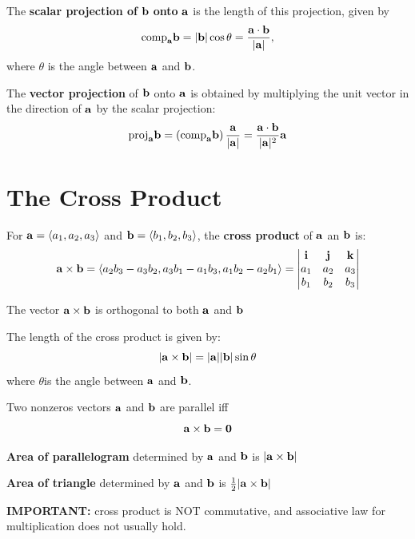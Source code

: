 \documentclass{report}
\begin{document}
The \textbf{scalar projection of} $\mathbf{b}$ \textbf{onto} $\mathbf{a}$ is the length of this 
projection, given by
\[
\text{comp}_{\mathbf{a}} \mathbf{b} = |\mathbf{b}|\cos\theta = \frac{\mathbf{a} \cdot \mathbf{b}}{|\mathbf{a}|},
\]
where $\theta$ is the angle between $\mathbf{a}$ and $\mathbf{b}$.

The \textbf{vector projection} of $\mathbf{b}$ onto $\mathbf{a}$ is obtained by multiplying the 
unit vector in the direction of $\mathbf{a}$ by the scalar projection:
\[
\text{proj}_{\mathbf{a}} \mathbf{b} = \left(\text{comp}_{\mathbf{a}} \mathbf{b} \right)\frac{\mathbf{a}}{|\mathbf{a}|} 
= \frac{\mathbf{a} \cdot \mathbf{b}}{|\mathbf{a}|^2}\mathbf{a}
\]

\section{The Cross Product}

\begin{definition}
For $\mathbf{a} = \langle a_1, a_2, a_3 \rangle$ and $\mathbf{b} = \langle b_1, b_2, b_3 \rangle$, the \textbf{cross product}
of $\mathbf{a}$ an $\mathbf{b}$ is:
\[\mathbf{a} \times \mathbf{b} = \langle a_2 b_3 - a_3 b_2, a_3 b_1 - a_1 b_3, a_1 b_2 - a_2 b_1 \rangle = \begin{vmatrix}
\mathbf{i} & \mathbf{j} & \mathbf{k} \\
a_1 & a_2 & a_3 \\
b_1 & b_2 & b_3
\end{vmatrix}
\]
\end{definition}

\begin{theorem}
    The vector $\mathbf{a} \times \mathbf{b}$ is orthogonal to both $\mathbf{a}$ and $\mathbf{b}$
\end{theorem}

\begin{theorem}
    The length of the cross product is given by: 
    \[ |\mathbf{a} \times \mathbf{b}| = |\mathbf{a}| |\mathbf{b}| \sin \theta\]
    where $\theta$is the angle between $\mathbf{a}$ and $\mathbf{b}$.
\end{theorem}

\begin{corollary}
    Two nonzeros vectors $\mathbf{a}$ and $\mathbf{b}$ are parallel iff 
    \[\mathbf{a} \times \mathbf{b} = \mathbf{0}\]
\end{corollary}

\textbf{Area of parallelogram} determined by $\mathbf{a}$ and $\mathbf{b}$ is $|\mathbf{a} \times \mathbf{b}|$

\textbf{Area of triangle} determined by $\mathbf{a}$ and $\mathbf{b}$ is $\frac{1}{2}|\mathbf{a} \times \mathbf{b}|$

\textbf{IMPORTANT:} cross product is NOT commutative, and associative law for multiplication does not usually hold.
\end{document}
